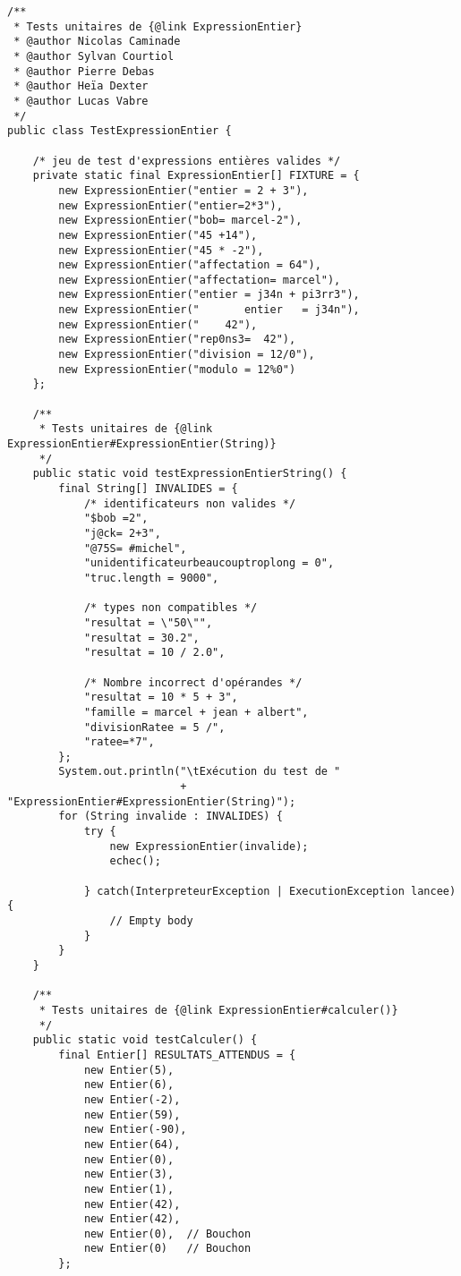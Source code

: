\begin{enum}
\begin{verbatim}
/**
 * Tests unitaires de {@link ExpressionEntier}
 * @author Nicolas Caminade
 * @author Sylvan Courtiol
 * @author Pierre Debas
 * @author Heïa Dexter
 * @author Lucas Vabre
 */
public class TestExpressionEntier {
    
    /* jeu de test d'expressions entières valides */
    private static final ExpressionEntier[] FIXTURE = {
        new ExpressionEntier("entier = 2 + 3"),
        new ExpressionEntier("entier=2*3"),
        new ExpressionEntier("bob= marcel-2"),
        new ExpressionEntier("45 +14"),
        new ExpressionEntier("45 * -2"),
        new ExpressionEntier("affectation = 64"),
        new ExpressionEntier("affectation= marcel"),
        new ExpressionEntier("entier = j34n + pi3rr3"),
        new ExpressionEntier("       entier   = j34n"),
        new ExpressionEntier("    42"),
        new ExpressionEntier("rep0ns3=  42"),
        new ExpressionEntier("division = 12/0"),
        new ExpressionEntier("modulo = 12%0")
    };
    
    /**
     * Tests unitaires de {@link ExpressionEntier#ExpressionEntier(String)}
     */
    public static void testExpressionEntierString() {
        final String[] INVALIDES = {
            /* identificateurs non valides */
            "$bob =2",
            "j@ck= 2+3",
            "@75S= #michel",
            "unidentificateurbeaucouptroplong = 0",
            "truc.length = 9000",
            
            /* types non compatibles */
            "resultat = \"50\"",
            "resultat = 30.2",
            "resultat = 10 / 2.0",
            
            /* Nombre incorrect d'opérandes */
            "resultat = 10 * 5 + 3",
            "famille = marcel + jean + albert",
            "divisionRatee = 5 /",
            "ratee=*7",
        };
        System.out.println("\tExécution du test de "
                           + "ExpressionEntier#ExpressionEntier(String)");
        for (String invalide : INVALIDES) {
            try {
                new ExpressionEntier(invalide);
                echec();
                
            } catch(InterpreteurException | ExecutionException lancee) {
                // Empty body
            }
        }
    }
    
    /**
     * Tests unitaires de {@link ExpressionEntier#calculer()}
     */
    public static void testCalculer() {
        final Entier[] RESULTATS_ATTENDUS = {
            new Entier(5),
            new Entier(6),
            new Entier(-2),
            new Entier(59),
            new Entier(-90),
            new Entier(64),
            new Entier(0),
            new Entier(3),
            new Entier(1),
            new Entier(42),
            new Entier(42),
            new Entier(0),  // Bouchon
            new Entier(0)   // Bouchon
        };
        

\end{verbatim}
\end{enum}
